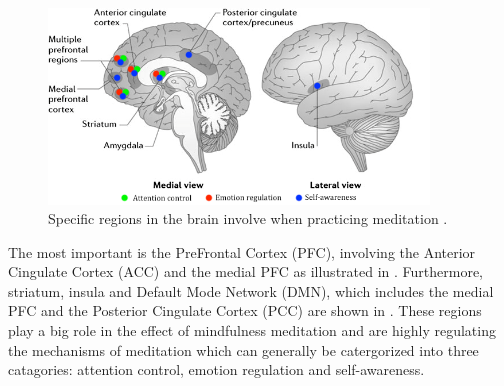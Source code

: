 \begin{figure}[H]
	\includegraphics[width=0.9\textwidth]{figures/brain_meditation.png} 
	\caption{Specific regions in the brain involve when practicing meditation \cite{Tang2017}.}
	\label{fig:brain_meditation}  
\end{figure}

The most important is the PreFrontal Cortex (PFC), involving the Anterior Cingulate Cortex (ACC) and the medial PFC as illustrated in . Furthermore, striatum, insula and Default Mode Network (DMN), which includes the medial PFC and the Posterior Cingulate Cortex (PCC) are shown in . These regions play a big role in the effect of mindfulness meditation and are highly regulating the mechanisms of meditation which can generally be catergorized into three catagories: attention control, emotion regulation and self-awareness. 

  
